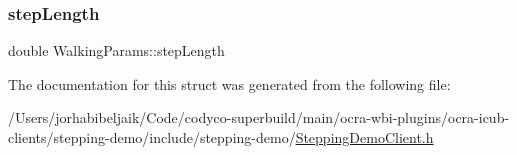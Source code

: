 \hypertarget{structWalkingParams_ad719bbe7ba3ed5ad027d0c42522693d7}{}\label{structWalkingParams_ad719bbe7ba3ed5ad027d0c42522693d7} 
\subsubsection{\texorpdfstring{step\+Length}{stepLength}}
{\footnotesize\ttfamily double Walking\+Params\+::step\+Length}



The documentation for this struct was generated from the following file\+:\begin{DoxyCompactItemize}
\item 
/\+Users/jorhabibeljaik/\+Code/codyco-\/superbuild/main/ocra-\/wbi-\/plugins/ocra-\/icub-\/clients/stepping-\/demo/include/stepping-\/demo/\hyperlink{SteppingDemoClient_8h}{Stepping\+Demo\+Client.\+h}\end{DoxyCompactItemize}

